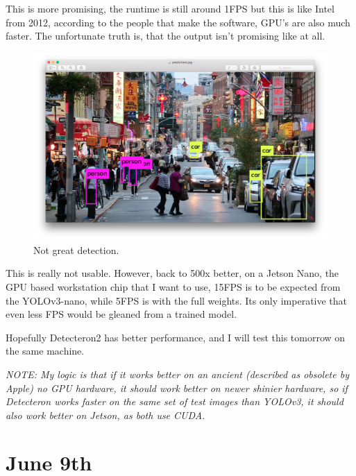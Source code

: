 \documentclass{article}
\begin{document}
This is more promising, the runtime is still around 1FPS but this is like Intel from 2012, according to the people that make the software, GPU's are also much faster. The unfortunate truth is, that the output isn't promising like at all.

\begin{figure}[htbp]
    \centerline{\includegraphics[scale=0.3]{Images/PredS4.png}}
    \caption{Not great detection.}
    \label{fig5}
\end{figure}

This is really not usable. However, back to 500x better, on a Jetson Nano, the GPU based workstation chip that I want to use, 15FPS is to be expected from the YOLOv3-nano, while 5FPS is with the full weights. Its only imperative that even less FPS would be gleaned from a trained model.

Hopefully Detecteron2 has better performance, and I will test this tomorrow on the same machine.

\textit{NOTE: My logic is that if it works better on an ancient (described as obsolete by Apple) no GPU hardware, it should work better on newer shinier hardware, so if Detecteron works faster on the same set of test images than YOLOv3, it should also work better on Jetson, as both use CUDA.}

\section{June 9th}
\end{document}
